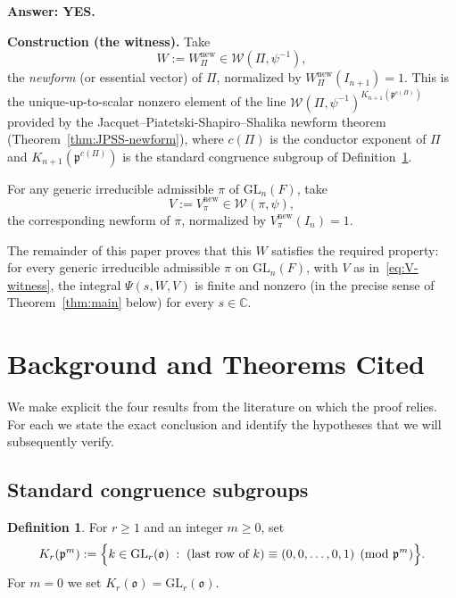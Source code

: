 \documentclass[12pt]{article}
\theoremstyle{definition}
\newtheorem{definition}[theorem]{Definition}
\begin{document}
\medskip

\noindent\textbf{Answer: YES.}

\medskip

\noindent\textbf{Construction (the witness).} Take
\begin{equation}\label{eq:W-witness}
W:=W_\Pi^{\mathrm{new}}\in\mathcal{W}(\Pi,\psi^{-1}),
\end{equation}
the \emph{newform} (or essential vector) of $\Pi$, normalized by $W_\Pi^{\mathrm{new}}(I_{n+1})=1$. This is the unique-up-to-scalar nonzero element of the line $\mathcal{W}(\Pi,\psi^{-1})^{K_{n+1}(\mathfrak{p}^{c(\Pi)})}$ provided by the Jacquet--Piatetski-Shapiro--Shalika newform theorem (Theorem~\ref{thm:JPSS-newform}), where $c(\Pi)$ is the conductor exponent of $\Pi$ and $K_{n+1}(\mathfrak{p}^{c(\Pi)})$ is the standard congruence subgroup of Definition~\ref{def:K1}.

For any generic irreducible admissible $\pi$ of $\mathrm{GL}_n(F)$, take
\begin{equation}\label{eq:V-witness}
V:=V_\pi^{\mathrm{new}}\in\mathcal{W}(\pi,\psi),
\end{equation}
the corresponding newform of $\pi$, normalized by $V_\pi^{\mathrm{new}}(I_n)=1$.

The remainder of this paper proves that this $W$ satisfies the required property: for every generic irreducible admissible $\pi$ on $\mathrm{GL}_n(F)$, with $V$ as in~\eqref{eq:V-witness}, the integral $\Psi(s,W,V)$ is finite and nonzero (in the precise sense of Theorem~\ref{thm:main} below) for every $s\in\mathbb{C}$.

\section{Background and Theorems Cited}

We make explicit the four results from the literature on which the proof relies. For each we state the exact conclusion and identify the hypotheses that we will subsequently verify.

\subsection{Standard congruence subgroups}

\begin{definition}\label{def:K1}
For $r\ge 1$ and an integer $m\ge 0$, set
\begin{equation}\label{eq:K1-def}
K_r(\mathfrak{p}^m):=\Bigl\{k\in\mathrm{GL}_r(\mathfrak{o})\;:\; (\text{last row of }k)\equiv(0,0,\ldots,0,1)\pmod{\mathfrak{p}^m}\Bigr\}.
\end{equation}
For $m=0$ we set $K_r(\mathfrak{o})=\mathrm{GL}_r(\mathfrak{o})$.
\end{definition}
\end{document}
